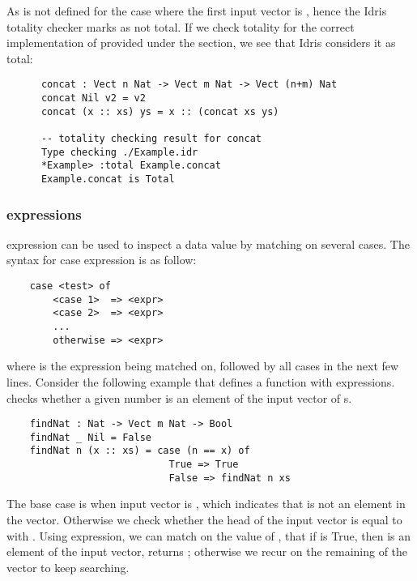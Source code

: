 As  is not defined for the case where the first input vector is , hence the Idris totality checker marks  as not total. If we check totality for the correct implementation of  provided under the  section, we see that Idris considers it as total: 
\begin{lstlisting}
      concat : Vect n Nat -> Vect m Nat -> Vect (n+m) Nat
      concat Nil v2 = v2
      concat (x :: xs) ys = x :: (concat xs ys)

      -- totality checking result for concat
      Type checking ./Example.idr
      *Example> :total Example.concat
      Example.concat is Total
 \end{lstlisting}


\subsubsection*{\textbf{} expressions}
 expression can be used to inspect a data value by matching on several cases. The syntax for case expression is as follow: 
\begin{lstlisting}
    case <test> of
        <case 1>  => <expr>
        <case 2>  => <expr>
        ...
        otherwise => <expr>
\end{lstlisting}
where  is the expression being matched on, followed by all cases in the next few lines. 
Consider the following example that defines a function  with  expressions.  checks whether a given number  is an element of the input vector of s. 
\begin{lstlisting}
    findNat : Nat -> Vect m Nat -> Bool
    findNat _ Nil = False
    findNat n (x :: xs) = case (n == x) of 
                            True => True
                            False => findNat n xs
\end{lstlisting}

The base case is when input vector is , which indicates that  is not an element in the vector. Otherwise we check whether the head of the input vector  is equal to  with . Using  expression, we can match on the value of , that if  is True, then  is an element of the input vector,  returns ; otherwise we recur on the remaining of the vector  to keep searching. 


